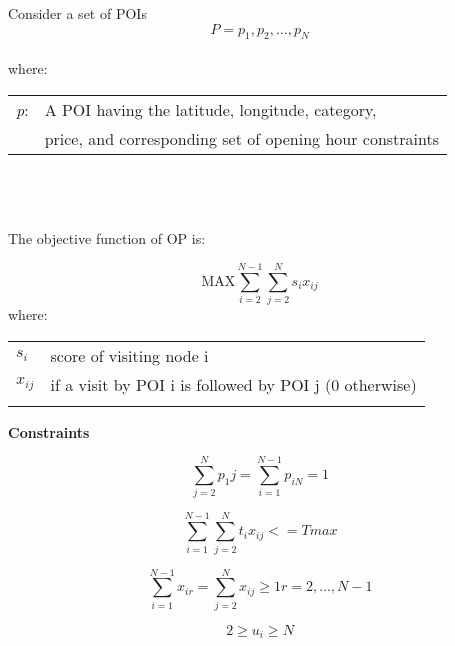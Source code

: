


\setlength{\tabcolsep}{20pt}

Consider a set of POIs \[P = {p_1,p_2,\ldots,p_N}\]
\\
where:
\\

\begin{tabular}{l l}


\textit{p}:  &  A POI having the latitude, longitude, category,\\
 & price, and corresponding set of opening hour constraints \\
\end{tabular}
\\
\\
\\

The objective function of OP is:

\[ \text{MAX}  \sum_{i=2}^{N-1} \sum_{j=2}^{N} {s_i}{x_{ij}} \]
where:
\\
\begin{tabular}{l l}
\textit{$s_i$} & score of visiting node i \\
\textit{$x_{ij}$} & if a visit by POI i is followed by POI j (0 otherwise)\\

                  & \\
\end{tabular}


\textbf{Constraints} 

\begin{multicols}{2}
\begin{equation} 
    \label{constraintOne}
    \sum_{j=2}^{N} p_1j = \sum_{i=1}^{N-1} p_{iN}= 1
\end{equation}

\begin{equation} 
    \label{constraintTwo}
    \sum_{i=1}^{N-1} \sum_{j=2}^{N} t_{i}x_{ij}<= Tmax
\end{equation}


\end{multicols}

\begin{multicols}{2}

\begin{equation} 
    \label{constraintThree}
    \sum_{i=1}^{N-1} x_{ir} = \sum_{j=2}^{N} x_{ij} \geq 1  r = 2, \ldots, N-1
\end{equation}

\begin{equation} 
    \label{constraintFour}
    2 \geq u_i \geq N 
\end{equation}
\end{multicols}

